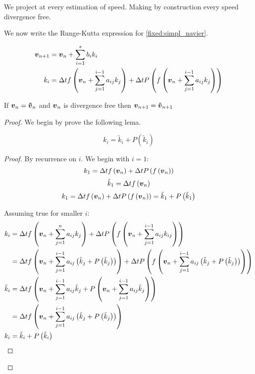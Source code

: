 We project at every estimation of speed. Making by construction every speed divergence free.

We now write the Runge-Kutta expression for \ref{fixed:simpl_navier}.

\begin{align}
	{\boldsymbol {v}}_{n+1}&={\boldsymbol {v}}_{n}+\sum_{i=1}^{s}b_{i}k_{i}\\
	k_{i}&=\Delta t f\left({\boldsymbol {v}}_{n}+\sum_{j=1}^{i-1}a_{ij}k_{j}\right)+\Delta t P\left(f\left({\boldsymbol {v}}_{n}+\sum_{j=1}^{i-1}a_{ij}k_{j}\right)\right)
\end{align}

\begin{thm}
If ${\boldsymbol {v}}_{n}={\boldsymbol {\tilde{v}}}_{n}$ and ${\boldsymbol {v}}_n$ is divergence free then ${\boldsymbol {v}}_{n+1}={\boldsymbol {\tilde{v}}}_{n+1}$ 
\end{thm}
 \begin{proof}
 We begin by prove the following lema.
 \begin{lem}
 \begin{equation}
  k_{i}=\tilde{k}_{i}+P(\tilde{k}_{i})
 \end{equation}
 \end{lem}
 \begin{proof}
 By recurrence on $i$.
 We begin with $i=1$:
 \begin{equation}
  k_{1}=\Delta tf\left({\boldsymbol {v}}_n\right)+\Delta tP\left(f\left({\boldsymbol {v}}_n\right)\right)
 \end{equation}
\begin{equation}
 \tilde{k}_{1}=\Delta tf\left({\boldsymbol {v}}_n\right)
\end{equation}
 \begin{equation}
  k_{1}=\Delta t f\left({\boldsymbol {v}}_n\right)+\Delta tP\left(f\left({\boldsymbol {v}}_n\right)\right)=\tilde{k}_1+P\left(\tilde{k}_1\right)
 \end{equation}
 
 Assuming true for smaller $i$:
 \begin{align*}
  k_{i}&=\Delta tf\left({\boldsymbol {v}}_n+\sum_{j=1}^{n}a_{ij}k_{j}\right)+\Delta tP\left(f\left({\boldsymbol {v}}_n+\sum_{j=1}^{i-1}a_{ij}k_{ij}\right)\right)\\
  &=\Delta tf\left({\boldsymbol {v}}_n+\sum_{j=1}^{i-1}a_{ij}\left(\tilde{k}_{j}+P\left(\tilde{k}_{j}\right)\right)\right)+\Delta tP\left(f\left({\boldsymbol {v}}_n+\sum_{j=1}^{i-1}a_{ij}\left(\tilde{k}_{j}+P\left(\tilde{k}_{j}\right)\right)\right)\right)\\
  \tilde{k}_{i}&=\Delta tf\left({\boldsymbol {v}}_n+\sum_{j=1}^{i-1}a_{ij}\tilde{k}_{j}+P\left({\boldsymbol {v}}_n+\sum_{j=1}^{i-1}a_{ij}\tilde{k}_{j}\right)\right)\\
  &=\Delta tf\left({\boldsymbol {v}}_n+\sum_{j=1}^{i-1}a_{ij}\left(\tilde{k}_{j}+P\left(\tilde{k}_{j}\right)\right)\right)\\
  k_{i}&=\tilde{k}_{i}+P\left(\tilde{k}_{i}\right)
 \end{align*}
 \end{proof}
 

\end{proof}
